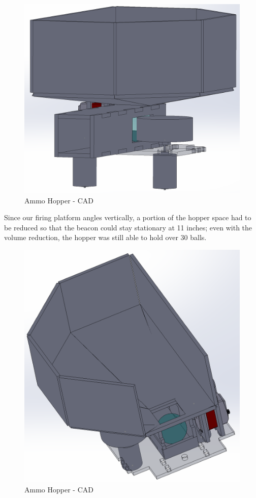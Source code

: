 \documentclass{article}
\begin{document}
\begin{figure}[H]
    \centering
    \includegraphics[width = 5in]{HopperCAD.PNG}
    \caption{Ammo Hopper - CAD}
    \label{fig:HopperCAD}
\end{figure}

Since our firing platform angles vertically, a portion of the hopper space had to be reduced so that the beacon could stay stationary at 11 inches; even with the volume reduction, the hopper was still able to hold over 30 balls.

\begin{figure}[H]
    \centering
    \includegraphics[width = 5in]{HopperFeedCAD.PNG}
    \caption{Ammo Hopper - CAD}
    \label{fig:HopperFeedCAD}
\end{figure}
\end{document}
